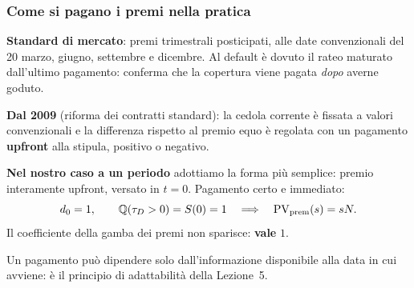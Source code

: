 \begin{frame}%
%

\frametitle{Come si pagano i premi nella pratica}%
%

%


\begin{stepitemize}
\item \textbf{Standard di mercato}: premi trimestrali posticipati, alle date
convenzionali del 20 marzo, giugno, settembre e dicembre. Al default \`{e}
dovuto il rateo maturato dall'ultimo pagamento: conferma che la copertura
viene pagata \emph{dopo} averne goduto.

\item \textbf{Dal 2009} (riforma dei contratti standard): la cedola corrente
\`{e} fissata a valori convenzionali e la differenza rispetto al premio equo
\`{e} regolata con un pagamento \textbf{upfront} alla stipula, positivo o negativo.

\item \textbf{Nel nostro caso a un periodo} adottiamo la forma pi\`{u}
semplice: premio interamente upfront, versato in $t=0$. Pagamento certo e
immediato:
\[
d_{0}=1,\qquad\Q(\tau_{D}>0)=S(0)=1\quad\Longrightarrow\quad\mathrm{PV}%
_{\mathrm{prem}}(s)=sN.
\]
Il coefficiente della gamba dei premi non sparisce: \textbf{vale} $1$.
\end{stepitemize}

\medskip

\begin{center}
{\small Un pagamento pu\`{o} dipendere solo dall'informazione disponibile alla
data in cui avviene: \`{e} il principio di adattabilit\`{a} della Lezione~5.}
\end{center}

%

\transboxout
\end{frame}%



